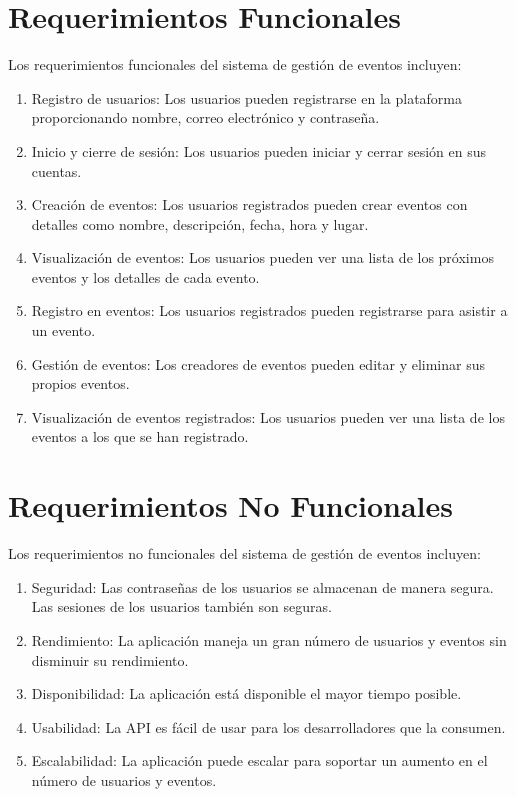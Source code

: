 \documentclass[a4paper]{article}
\begin{document}
\section{Requerimientos Funcionales}
Los requerimientos funcionales del sistema de gestión de eventos incluyen:
\begin{enumerate}
    \item Registro de usuarios: Los usuarios pueden registrarse en la plataforma proporcionando nombre, correo electrónico y contraseña.
    \item Inicio y cierre de sesión: Los usuarios pueden iniciar y cerrar sesión en sus cuentas.
    \item Creación de eventos: Los usuarios registrados pueden crear eventos con detalles como nombre, descripción, fecha, hora y lugar.
    \item Visualización de eventos: Los usuarios pueden ver una lista de los próximos eventos y los detalles de cada evento.
    \item Registro en eventos: Los usuarios registrados pueden registrarse para asistir a un evento.
    \item Gestión de eventos: Los creadores de eventos pueden editar y eliminar sus propios eventos.
    \item Visualización de eventos registrados: Los usuarios pueden ver una lista de los eventos a los que se han registrado.
\end{enumerate}

\section{Requerimientos No Funcionales}
Los requerimientos no funcionales del sistema de gestión de eventos incluyen:
\begin{enumerate}
    \item Seguridad: Las contraseñas de los usuarios se almacenan de manera segura. Las sesiones de los usuarios también son seguras.
    \item Rendimiento: La aplicación maneja un gran número de usuarios y eventos sin disminuir su rendimiento.
    \item Disponibilidad: La aplicación está disponible el mayor tiempo posible.
    \item Usabilidad: La API es fácil de usar para los desarrolladores que la consumen.
    \item Escalabilidad: La aplicación puede escalar para soportar un aumento en el número de usuarios y eventos.
\end{enumerate}
\end{document}
